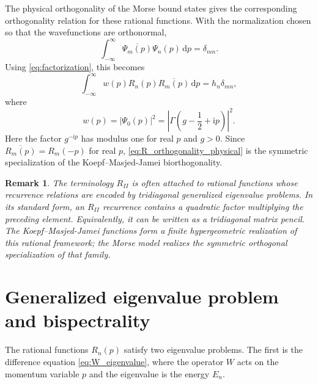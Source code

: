 \documentclass[11pt,reqno]{amsart}
\newcommand{\ii}{\mathrm{i}}
\newcommand{\dd}{\mathrm{d}}
\numberwithin{equation}{section}
\newtheorem{remark}[theorem]{Remark}
\begin{document}
The physical orthogonality of the Morse bound states gives the corresponding orthogonality
relation for these rational functions.  With the normalization chosen so that the wavefunctions are
orthonormal,
\begin{equation}
  \int_{-\infty}^{\infty}
  \overline{\Psi_m(p)}\Psi_n(p)\,\dd p=\delta_{mn}.
\end{equation}
Using \eqref{eq:factorization}, this becomes
\begin{equation}
  \int_{-\infty}^{\infty}
  w(p)R_n(p)\overline{R_m(p)}\,\dd p=h_n\delta_{mn},
  \label{eq:R_orthogonality_physical}
\end{equation}
where
\begin{equation}
  w(p)=|\Psi_0(p)|^2
  =\left|\Gamma\!\left(g-\frac12+\ii p\right)\right|^2.
  \label{eq:weight}
\end{equation}
Here the factor $g^{-\ii p}$ has modulus one for real $p$ and $g>0$.  Since
$\overline{R_m(p)}=R_m(-p)$ for real $p$, \eqref{eq:R_orthogonality_physical} is the symmetric
specialization of the Koepf--Masjed-Jamei biorthogonality.

\begin{remark}
The terminology $R_{II}$ is often attached to rational functions whose recurrence relations are
encoded by tridiagonal generalized eigenvalue problems.  In its standard form, an $R_{II}$
recurrence contains a quadratic factor multiplying the preceding element.  Equivalently, it can be
written as a tridiagonal matrix pencil.  The Koepf--Masjed-Jamei functions form a finite
hypergeometric realization of this rational framework; the Morse model realizes the symmetric
orthogonal specialization of that family.
\end{remark}

\section{Generalized eigenvalue problem and bispectrality}\label{sec:gevp}

The rational functions $R_n(p)$ satisfy two eigenvalue problems.  The first is the difference
equation \eqref{eq:W_eigenvalue}, where the operator $W$ acts on the momentum variable $p$ and
the eigenvalue is the energy $E_n$.
\end{document}
